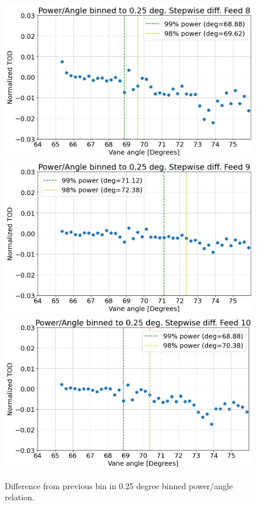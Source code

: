 \documentclass[10pt, a4paper]{article}
\begin{document}
\begin{figure}[h!]
    \centering
    \includegraphics[scale=0.45]{../binned_diff8.png}
    \includegraphics[scale=0.45]{../binned_diff9.png}
    \includegraphics[scale=0.45]{../binned_diff10.png}
    \caption{Difference from previous bin in 0.25 degree binned power/angle relation.}
    \label{}
\end{figure}
\end{document}
